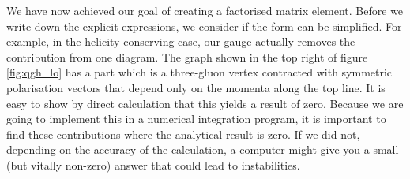 We have now achieved our goal of creating a factorised matrix element. Before we write down the explicit expressions, we consider if the form can be simplified. For example, in the helicity conserving case, our gauge actually removes the contribution from one diagram. The graph shown in the top right of figure \ref{fig:qgh_lo} has a part which is a three-gluon vertex contracted with symmetric polarisation vectors that depend only on the momenta along the top line. It is easy to show by direct calculation that this yields a result of zero. Because we are going to implement this in a numerical integration program, it is important to find these contributions where the analytical result is zero. If we did not, depending on the accuracy of the calculation, a computer might give you a small (but vitally non-zero) answer that could lead to instabilities.

